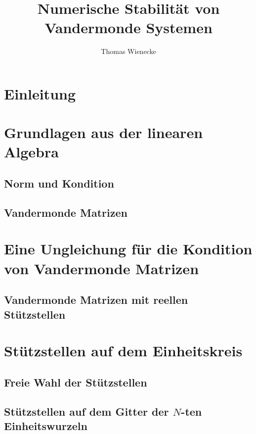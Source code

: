 \documentclass[a4paper, 11pt]{scrreprt}
\title{Numerische Stabilität von Vandermonde Systemen}
\author{Thomas Wienecke}
\begin{document}
\maketitle
\tableofcontents

\chapter{Einleitung}

\chapter{Grundlagen aus der linearen Algebra}
\section{Norm und Kondition}
\section{Vandermonde Matrizen}

\chapter{Eine Ungleichung für die Kondition von Vandermonde Matrizen}
\section{Vandermonde Matrizen mit reellen Stützstellen}

\chapter{Stützstellen auf dem Einheitskreis}
\section{Freie Wahl der Stützstellen}
\section{Stützstellen auf dem Gitter der $N$-ten Einheitswurzeln}



\end{document}
